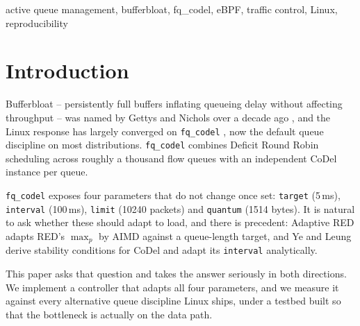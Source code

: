 \documentclass[conference]{IEEEtran}
\begin{document}
\begin{abstract}
The consequence is a predicate an operator can evaluate in advance. CoDel's own
guidance places a correctly configured deployment at $r \approx 0.05$ to
$0.10$, so half the available benefit arrives five to ten times outside that
envelope. Adaptation is a remedy for misconfiguration rather than an
improvement on correct configuration, which unifies the null results in this
work and in the literature as one effect. The gain is bought with roughly
$\LawDropRiseHigh\%$ more drops and comparable retransmissions, at a throughput
cost never exceeding $\LawWorstThroughput\%$. Four defects in our own
controller, each an absolute constant in a system whose subject is a
dimensionless ratio, would have decided this result rather than measured it;
we report them and the checks that caught them.
\end{abstract}

\begin{IEEEkeywords}
active queue management, bufferbloat, fq\_codel, eBPF, traffic control,
Linux, reproducibility
\end{IEEEkeywords}

\section{Introduction}

Bufferbloat -- persistently full buffers inflating queueing delay without
affecting throughput -- was named by Gettys and Nichols over a decade ago
\cite{gettys2012}, and the Linux response has largely converged on
\texttt{fq\_codel} \cite{rfc8290}, now the default queue discipline on most
distributions. \texttt{fq\_codel} combines Deficit Round Robin scheduling
across roughly a thousand flow queues with an independent CoDel
\cite{nichols2012,rfc8289} instance per queue.

\texttt{fq\_codel} exposes four parameters that do not change once set:
\texttt{target} (5\,ms), \texttt{interval} (100\,ms), \texttt{limit} (10240
packets) and \texttt{quantum} (1514 bytes). It is natural to ask whether these
should adapt to load, and there is precedent: Adaptive RED \cite{ared2001}
adapts RED's $\max_p$ by AIMD against a queue-length target, and Ye and Leung
\cite{yeleung2020} derive stability conditions for CoDel and adapt its
\texttt{interval} analytically.

This paper asks that question and takes the answer seriously in both
directions. We implement a controller that adapts all four parameters, and we
measure it against every alternative queue discipline Linux ships, under a
testbed built so that the bottleneck is actually on the data path.
\end{document}
